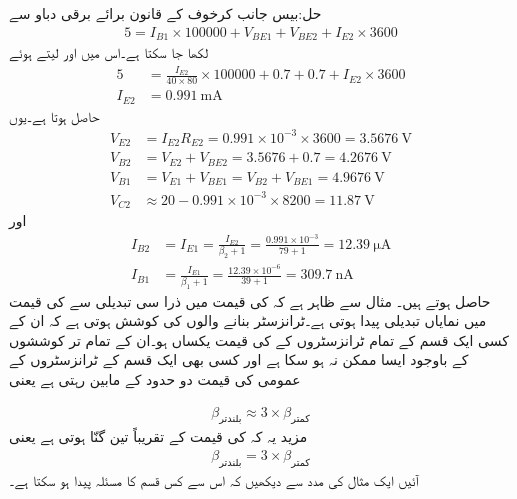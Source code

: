 حل:بیس جانب کرخوف کے قانون برائے برقی دباو سے
\begin{align*}
5=I_{B1} \times 100000+V_{BE1}+V_{BE2}+I_{E2} \times 3600
\end{align*}
لکھا جا سکتا ہے۔اس میں  اور  لیتے ہوئے
\begin{align*}
5&=\frac{I_{E2}}{40 \times 80} \times 100000+0.7+0.7+I_{E2} \times 3600\\
I_{E2}&=\SI{0.991}{\milli \ampere}
\end{align*}
حاصل ہوتا ہے۔یوں
\begin{align*}
V_{E2}&=I_{E2} R_{E2}=0.991 \times 10^{-3} \times 3600=\SI{3.5676}{\volt}\\
V_{B2}&=V_{E2}+V_{BE2}=3.5676+0.7=\SI{4.2676}{\volt}\\
V_{B1}&=V_{E1}+V_{BE1}=V_{B2}+V_{BE1}=\SI{4.9676}{\volt}\\
V_{C2}& \approx 20-0.991 \times 10^{-3} \times  8200=\SI{11.87}{\volt}
\end{align*}
اور
\begin{align*}
I_{B2}&=I_{E1}=\frac{I_{E2}}{\beta_2+1}=\frac{0.991 \times 10^{-3}}{79+1}=\SI{12.39}{\micro \ampere}\\
I_{B1}&=\frac{I_{E1}}{\beta_1+1}=\frac{12.39 \times 10^{-6}}{39+1}=\SI{309.7}{\nano \ampere}
\end{align*}
حاصل ہوتے ہیں۔
 \label{حصہ_تبدیلی_بٹا_سے_نکتہ_کارکردگی_کا_سرک_جانا}
مثال  سے ظاہر ہے کہ  کی قیمت میں ذرا سی تبدیلی سے  کی قیمت میں نمایاں تبدیلی پیدا ہوتی ہے۔ٹرانزسٹر بنانے والوں کی کوشش ہوتی ہے کہ ان کے کسی  ایک قسم کے تمام ٹرانزسٹروں کے  کی قیمت یکساں ہو۔ان کے تمام تر کوششوں کے باوجود ایسا ممکن نہ ہو سکا ہے اور کسی بھی ایک قسم کے ٹرانزسٹروں کے عمومی    کی قیمت دو حدود کے مابین رہتی ہے یعنی

\begin{align}
\beta_{\text{بلندتر}} \approx  3 \times \beta_{\text{کمتر}}
\end{align}
مزید یہ کہ  کی قیمت  کے تقریباً تین گنّا ہوتی ہے یعنی
\begin{align}
\beta_{\text{بلندتر}} =   { 3 \times \beta_{\text{کمتر}}}
\end{align}
آئیں ایک مثال کی مدد سے دیکھیں کہ اس سے کس قسم کا مسئلہ پیدا ہو سکتا ہے۔


